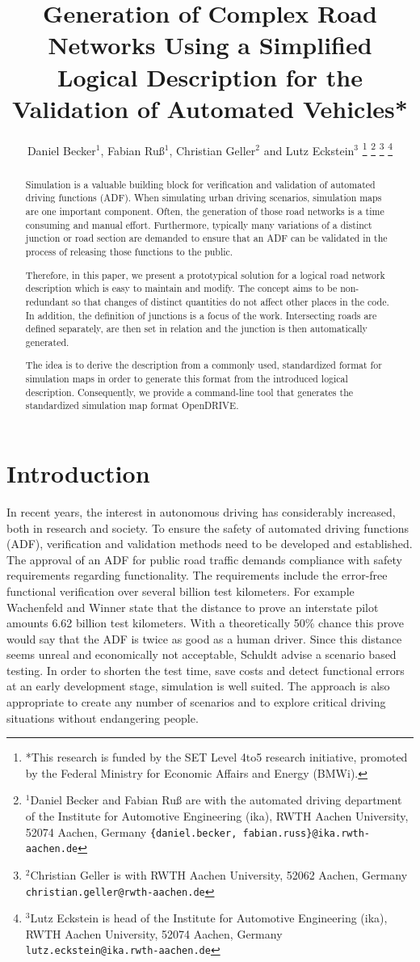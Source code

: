 \documentclass[a4paper, 10pt, conference]{ieeeconf}      %
\title{\LARGE \bf
Generation of Complex Road Networks Using a Simplified Logical Description for the Validation of Automated Vehicles*
}
\author{Daniel Becker$^{1}$, Fabian Ru{\ss}$^{1}$, Christian Geller$^2$ and Lutz Eckstein$^{3}$%
\thanks{*This research is funded by the SET Level 4to5 research initiative, promoted by the	Federal Ministry for Economic Affairs and Energy (BMWi).}%
\thanks{$^{1}$Daniel Becker and Fabian Ru{\ss} are with the automated driving department of the Institute for Automotive Engineering (ika), RWTH Aachen University, 52074 	Aachen, Germany {\tt\small \{daniel.becker, fabian.russ\}@ika.rwth-aachen.de}}%
\thanks{$^{2}$Christian Geller is with RWTH Aachen University, 52062 Aachen, Germany
	{\tt\small christian.geller@rwth-aachen.de}}%
\thanks{$^{3}$Lutz Eckstein is head of the Institute for Automotive Engineering (ika), RWTH Aachen University, 52074 Aachen, Germany {\tt\small lutz.eckstein@ika.rwth-aachen.de}}%
}
\begin{document}
\maketitle
\thispagestyle{empty}
\pagestyle{empty}

\begin{abstract} %
Simulation is a valuable building block for verification and validation of automated driving functions (ADF). When simulating urban driving scenarios, simulation maps are one important component. Often, the generation of those road networks is a time consuming and manual effort. Furthermore, typically many variations of a distinct junction or road section are demanded to ensure that an ADF can be validated in the process of releasing those functions to the public. 

Therefore, in this paper, we present a prototypical solution for a logical road network description which is easy to maintain and modify. The concept aims to be non-redundant so that changes of distinct quantities do not affect other places in the code. In addition, the definition of junctions is a focus of the work. Intersecting roads are defined separately, are then set in relation and the junction is then automatically generated. 

The idea is to derive the description from a commonly used, standardized format for simulation maps in order to generate this format from the introduced logical description. Consequently, we provide a command-line tool that generates the standardized simulation map format OpenDRIVE.

\end{abstract}

\section{Introduction}
In recent years, the interest in autonomous driving has considerably increased, both in research and society. To ensure the safety of automated driving functions (ADF), verification and validation methods need to be developed and established. The approval of an ADF for public road traffic demands compliance with safety requirements regarding functionality. The requirements include the error-free functional verification over several billion test kilometers. For example Wachenfeld and Winner \cite{wachenfeld2016release} state that the distance to prove an interstate pilot amounts 6.62 billion test kilometers. With a theoretically 50\% chance this prove would say that the ADF is twice as good as a human driver. Since this distance seems unreal and economically not acceptable, Schuldt \cite{schuldt2017beitrag} advise a scenario based testing. In order to shorten the test time, save costs and detect functional errors at an early development stage, simulation is well suited. The approach is also appropriate to create any number of scenarios and to explore critical driving situations without endangering people.
\end{document}
